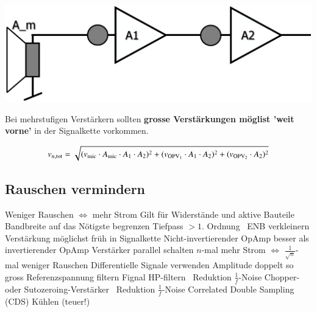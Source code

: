 \begin{minipage}[c]{0.4\columnwidth}
    \includegraphics[width=\columnwidth]{images/signal_to_noise_ratio.png}
\end{minipage}
\hfill
\begin{minipage}[c]{0.58\columnwidth}
    Bei mehrstufigen Verstärkern sollten \textbf{grosse Verstärkungen möglist 'weit vorne'} in der Signalkette vorkommen.
\end{minipage}

$$ v_{n, \rm tot} = \sqrt{(v_{\rm mic} \cdot A_{\rm mic} \cdot A_1 \cdot A_2)^2
+ (v_{\rm OPV_1} \cdot A_1 \cdot A_2)^2 + (v_{\rm OPV_2} \cdot  A_2)^2 } $$


\subsection{Rauschen vermindern}

\begin{outline}
    \1 Weniger Rauschen $\Leftrightarrow$ mehr Strom
        \2 Gilt für Widerstände und aktive Bauteile
    \1 Bandbreite auf das Nötigste begrenzen
        \2 Tiefpass $> 1.$ Ordnung \textrightarrow\ ENB verkleinern
    \1 Verstärkung möglichst früh in Signalkette
    \1 Nicht-invertierender OpAmp besser als invertierender OpAmp
    \1 Verstärker parallel schalten
        \2 $n$-mal mehr Strom $\Leftrightarrow$ $\frac{1}{\sqrt{n}}$-mal weniger Rauschen
    \1 Differentielle Signale verwenden
        \2 Amplitude doppelt so gross
    \1 Referenzspannung filtern
    \1 Fignal HP-filtern \textrightarrow\ Reduktion $\frac{1}{f}$-Noise
    \1 Chopper- oder Sutozeroing-Verstärker \textrightarrow\ Reduktion $\frac{1}{f}$-Noise
    \1 Correlated Double Sampling (CDS)
    \1 Kühlen (teuer!)
\end{outline}